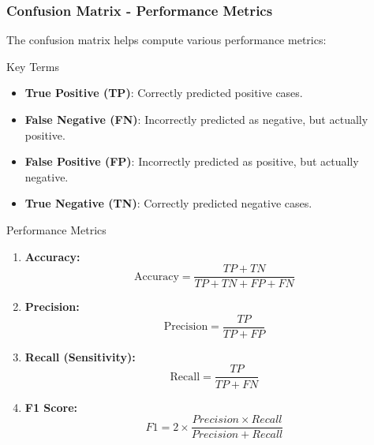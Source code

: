 \documentclass{beamer}
\begin{document}
\begin{frame}[fragile]
    \frametitle{Confusion Matrix - Performance Metrics}
    The confusion matrix helps compute various performance metrics:
    
    \begin{block}{Key Terms}
        \begin{itemize}
            \item \textbf{True Positive (TP)}: Correctly predicted positive cases.
            \item \textbf{False Negative (FN)}: Incorrectly predicted as negative, but actually positive.
            \item \textbf{False Positive (FP)}: Incorrectly predicted as positive, but actually negative.
            \item \textbf{True Negative (TN)}: Correctly predicted negative cases.
        \end{itemize}
    \end{block}
    
    \begin{block}{Performance Metrics}
       \begin{enumerate}
           \item \textbf{Accuracy:} 
           \[
           \text{Accuracy} = \frac{TP + TN}{TP + TN + FP + FN}
           \]
           \item \textbf{Precision:} 
           \[
           \text{Precision} = \frac{TP}{TP + FP}
           \]
           \item \textbf{Recall (Sensitivity):} 
           \[
           \text{Recall} = \frac{TP}{TP + FN}
           \]
           \item \textbf{F1 Score:} 
           \[
           F1 = 2 \times \frac{Precision \times Recall}{Precision + Recall}
           \]
       \end{enumerate}
    \end{block}
\end{frame}
\end{document}
